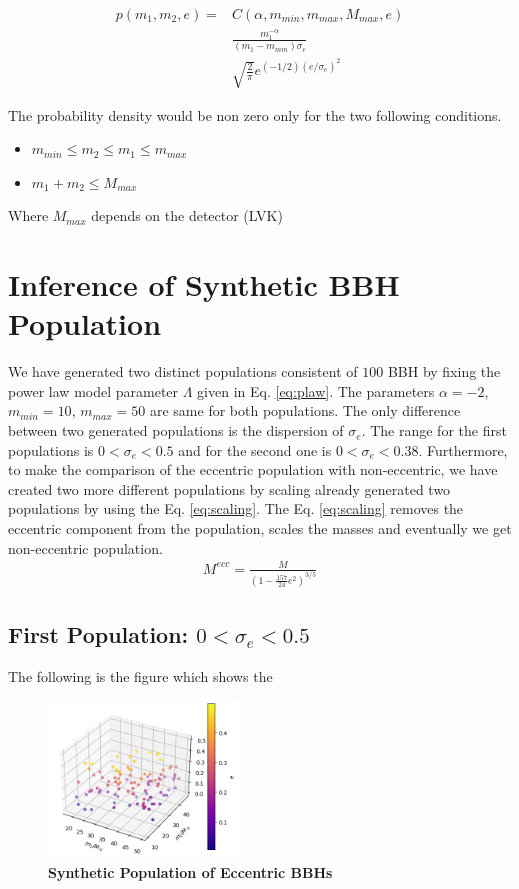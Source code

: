 \documentclass[twocolumn,prd,nofootinbib]{revtex4}
\begin{document}
\begin{align}
\label{eq:plaw}
p(m_1,m_2,e) = &C(\alpha,m_{min},m_{max},M_{max},e)  
\nonumber \\ & \frac{m_1^{-\alpha}}{(m_1-m_{min})\sigma_e} 
\nonumber \\ &
\sqrt{\frac{2}{\pi}} e^{(-1/2)(e/\sigma_e)^2}
\end{align}

The probability density would be non zero only for the two following conditions.

\begin{itemize}
    \item $m_{min}\leq m_2 \leq m_1 \leq m_{max}$
    \item $m_1+m_2 \leq M_{max}$
\end{itemize}
Where $M_{max}$ depends on the detector (LVK)

   
\section{Inference of Synthetic BBH Population}
We have generated two distinct populations consistent of $100$ BBH by fixing the power law model parameter $\Lambda$ given in Eq. \ref{eq:plaw}. 
The parameters $\alpha=-2$, $m_{min}=10$, $m_{max}=50$ are same for both populations. The only difference between two generated populations is the dispersion of $\sigma_e$. The range for the first populations is $0<\sigma_e<0.5$ and for the second one is $0<\sigma_e<0.38$.
Furthermore, to make the comparison of the eccentric population with non-eccentric, we have created two more different populations by scaling already generated two populations by using the Eq. \ref{eq:scaling}. The Eq. \ref{eq:scaling} removes the eccentric component from the population, scales the masses and eventually we get non-eccentric population.
\begin{align}
\label{eq:scaling}
M^{ecc} = \frac{M}{(1-\frac{157}{24}e^2)^{3/5}}
\end{align}

\subsection{First Population: $0<\sigma_e<0.5$}
The following is the figure which shows the 

\begin{figure}
\includegraphics[width=0.45\textwidth]{paper/figures/pop3d05.png}
\caption{\label{fig:population05}\textbf{Synthetic Population of Eccentric BBHs}}
\end{figure}
\end{document}
